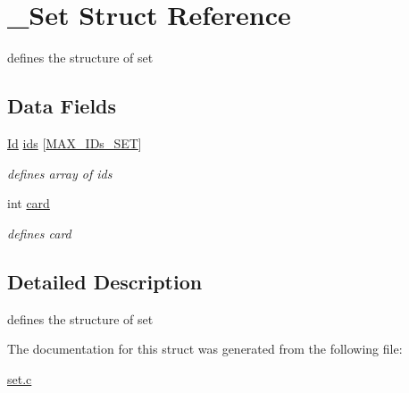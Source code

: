 \hypertarget{struct__Set}{}\section{\+\_\+\+Set Struct Reference}
\label{struct__Set}


defines the structure of set  


\subsection*{Data Fields}
\begin{DoxyCompactItemize}
\item 
\mbox{\label{struct__Set_afd885419ed2cef953046ccfc2457fcdb}} 
\hyperlink{types_8h_a845e604fb28f7e3d97549da3448149d3}{Id} \hyperlink{struct__Set_afd885419ed2cef953046ccfc2457fcdb}{ids} \mbox{[}\hyperlink{set_8h_a0ffebf572977a670aba207757c157eba}{M\+A\+X\+\_\+\+I\+Ds\+\_\+\+S\+ET}\mbox{]}
\begin{DoxyCompactList}\small\item\em defines array of ids \end{DoxyCompactList}\item 
\mbox{\label{struct__Set_afc4f545ff1fc4ad05f52990484963c58}} 
int \hyperlink{struct__Set_afc4f545ff1fc4ad05f52990484963c58}{card}
\begin{DoxyCompactList}\small\item\em defines card \end{DoxyCompactList}\end{DoxyCompactItemize}


\subsection{Detailed Description}
defines the structure of set 

The documentation for this struct was generated from the following file\+:\begin{DoxyCompactItemize}
\item 
\hyperlink{set_8c}{set.\+c}\end{DoxyCompactItemize}
